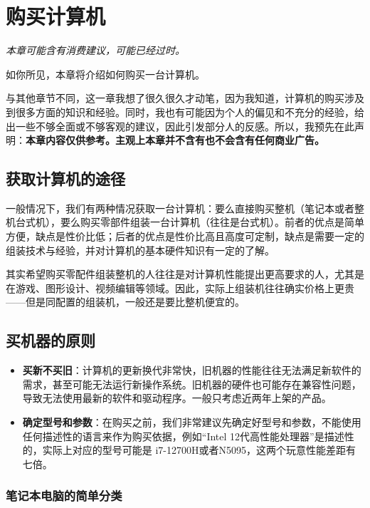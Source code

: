 \documentclass[../main.tex]{subfiles}
\begin{document}
\chapter{购买计算机}

\begin{flushright}
  \emph{本章可能含有消费建议，可能已经过时。}
\end{flushright}

如你所见，本章将介绍如何购买一台计算机。

与其他章节不同，这一章我想了很久很久才动笔，因为我知道，计算机的购买涉及到很多方面的知识和经验。同时，我也有可能因为个人的偏见和不充分的经验，给出一些不够全面或不够客观的建议，因此引发部分人的反感。所以，我预先在此声明：\textbf{本章内容仅供参考。主观上本章并不含有也不会含有任何商业广告。}

\section{获取计算机的途径}

一般情况下，我们有两种情况获取一台计算机：要么直接购买整机（笔记本或者整机台式机），要么购买零部件组装一台计算机（往往是台式机）。前者的优点是简单方便，缺点是性价比低；后者的优点是性价比高且高度可定制，缺点是需要一定的组装技术与经验，并对计算机的基本硬件知识有一定的了解。

其实希望购买零配件组装整机的人往往是对计算机性能提出更高要求的人，尤其是在游戏、图形设计、视频编辑等领域。因此，实际上组装机往往确实价格上更贵——但是同配置的组装机，一般还是要比整机便宜的。

\section{买机器的原则}

\begin{itemize}
  \item \textbf{买新不买旧}：计算机的更新换代非常快，旧机器的性能往往无法满足新软件的需求，甚至可能无法运行新操作系统。旧机器的硬件也可能存在兼容性问题，导致无法使用最新的软件和驱动程序。一般只考虑近两年上架的产品。
  \item \textbf{确定型号和参数}：在购买之前，我们非常建议先确定好型号和参数，不能使用任何描述性的语言来作为购买依据，例如“Intel 12代高性能处理器”是描述性的，实际上对应的型号可能是 i7-12700H或者N5095，这两个玩意性能差距有七倍。
\end{itemize}

\subsection{笔记本电脑的简单分类}
\end{document}
